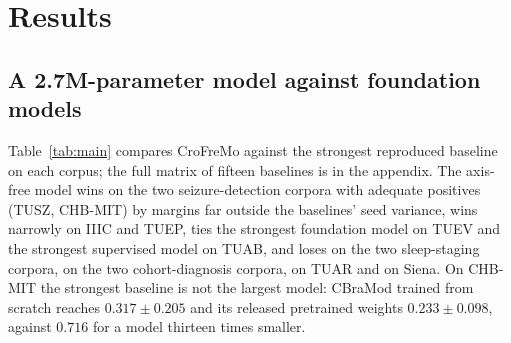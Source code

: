 \section{Results}
\label{sec:results}

\subsection{A 2.7M-parameter model against foundation models}
\label{sec:main}

Table~\ref{tab:main} compares CroFreMo against the strongest reproduced
baseline on each corpus; the full matrix of fifteen baselines is in the
appendix. The axis-free
model wins on the two seizure-detection corpora with adequate positives
(TUSZ, CHB-MIT) by margins far outside the baselines' seed variance, wins
narrowly on IIIC and TUEP, ties the strongest foundation model on TUEV and
the strongest supervised model on TUAB, and loses on the two sleep-staging
corpora, on the two cohort-diagnosis corpora, on TUAR and on Siena. On
CHB-MIT the strongest baseline is not the largest model: CBraMod trained
from scratch reaches $0.317 \pm 0.205$ and its released pretrained weights
$0.233 \pm 0.098$, against $0.716$ for a model thirteen times smaller.


